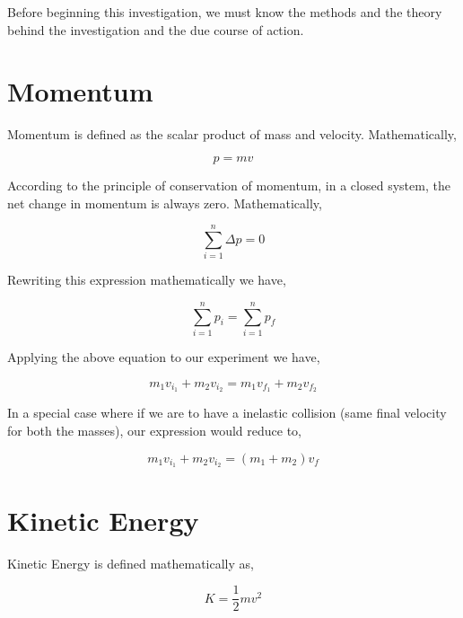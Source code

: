 {Before beginning this investigation, we must know the methods and the theory behind the investigation and the due course of action.}

\section{{Momentum}}

	{Momentum is defined as the scalar product of mass and velocity. Mathematically,}

		$$p = mv$$

	{According to the principle of conservation of momentum, in a closed system, the net change in momentum is always zero. Mathematically,}

		$$\sum_{i = 1}^{n}{\Delta p} = 0$$

	{Rewriting this expression mathematically we have,}

		$$\sum_{i = 1}^{n}{p_{i}} = \sum_{i = 1}^{n}{p_{f}}$$

	{Applying the above equation to our experiment we have,}

		$$m_{1}v_{i_{1}} + m_{2}v_{i_{2}} = m_{1}v_{f_{1}} + m_{2}v_{f_{2}}$$

	{In a special case where if we are to have a inelastic collision (same final velocity for both the masses), our expression would reduce to,}

		$$m_{1}v_{i_{1}} + m_{2}v_{i_{2}} = \left(m_{1} + m_{2}\right)v_{f}$$
		
\section{{Kinetic Energy}}

	{Kinetic Energy is defined mathematically as,}
	
		$$K = \frac{1}{2}mv^{2}$$

	{}
